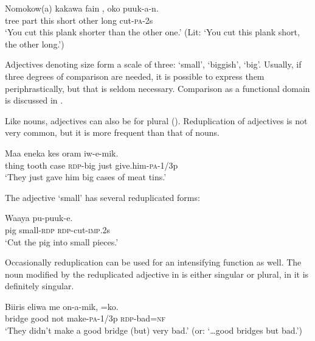 \ea%
\label{ex:3:x441}
\gll Nomokow(a) kakawa fain , oko  puuk-a-n. \\
tree part this short other long cut-\textsc{pa}-2s\\
\glt`You cut this plank shorter than the other one.' (Lit: `You cut this plank short, the other long.')
\z

Adjectives denoting size form a scale of three:  `small',  `biggish',  `big'. Usually, if three degrees of comparison are needed, it is possible to express them periphrastically, but that is seldom necessary. Comparison as a functional domain is discussed in . 

Like nouns, adjectives can also be  for plural  (). Reduplication of adjectives is not very common, but it is more frequent than that of nouns. 

\ea%
\label{ex:3:x85}
\gll Maa eneka kes  oram iw-e-mik. \\
thing tooth case \textsc{rdp}-big just give.him-\textsc{pa}-1/3p\\
\glt`They just gave him big cases of meat tins.'
\z

The adjective  `small' has several reduplicated forms: \textstyleEmphasizedVernacularWords{,}  \textstyleEmphasizedVernacularWords{,}  

\ea%
\label{ex:3:x486}
\gll Waaya  pu-puuk-e. \\
pig small-\textsc{rdp} \textsc{rdp}-cut-\textsc{imp}.2s\\
\glt`Cut the pig into small pieces.'
\z

Occasionally reduplication can be used for an intensifying function as well. The noun modified by the reduplicated adjective in  is either singular or plural, in  it is definitely singular.

\ea%
\label{ex:3:x485}
\gll Biiris eliwa me on-a-mik, =ko. \\
bridge good not make-\textsc{pa}-1/3p \textsc{rdp}-bad=\textsc{nf}\\
\glt`They didn't make a good bridge (but) very bad.' (or: `{\dots}good bridges but bad.')
\z


